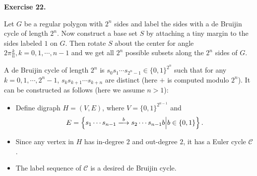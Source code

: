 \documentclass[a4paper]{article}
\newenvironment{exercise}[1]{
	\par
	\noindent\textbf{Exercise #1.}\quad
}{
	\par
	\bigskip
}
\newcommand{\cbra}[1]{\left\{ #1 \right\}}
\newcommand{\bin}{\{0,1\}}
\begin{document}
\begin{exercise}{22}
    Let $G$ be a regular polygon with $2^n$ sides and label the sides with a de Bruijin cycle of length $2^n$.
    Now construct a base set $S$ by attaching a tiny margin to the sides labeled $1$ on $G$.
    Then rotate $S$ about the center for angle $2\pi\frac kn,k=0,1,\cdots,n-1$ and we get all $2^n$ possible subsets
    along the $2^n$ sides of $G$.

    A de Bruijin cycle of length $2^n$ is $s_0s_1\cdots s_{2^n-1}\in\bin^{2^n}$ such that for any $k=0,1,\cdots,2^n-1$,
    $s_ks_{k+1}\cdots s_{k+n}$ are distinct (here $+$ is computed modulo $2^n$).
    It can be constructed as follows (here we assume $n>1$):
    \begin{itemize}
        \item Define digraph $H=(V,E)$, where $V=\bin^{2^{n-1}}$ and
            $$
            E=\cbra{s_1\cdots s_{n-1}\xlongrightarrow{b} s_2\cdots s_{n-1}b\middle|b\in\bin}.
            $$
        \item Since any vertex in $H$ has in-degree $2$ and out-degree $2$, it has a Euler cycle $\mathcal C$.
        \item The label sequence of $\mathcal C$ is a desired de Bruijin cycle.
    \end{itemize}
\end{exercise}
\end{document}
